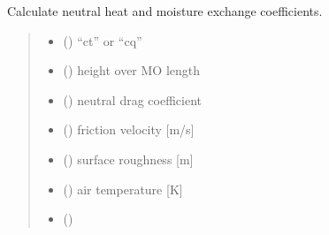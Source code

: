 \documentclass[letterpaper,10pt,english]{sphinxmanual}
\begin{document}
\begin{fulllineitems}

\pysigstartsignatures
{}
\pysigstopsignatures
\sphinxAtStartPar
Calculate neutral heat and moisture exchange coefficients.
\begin{quote}\begin{description}
\begin{itemize}
\item {} 
\sphinxAtStartPar
{} () \textendash{} “ct” or “cq”

\item {} 
\sphinxAtStartPar
{} () \textendash{} height over MO length

\item {} 
\sphinxAtStartPar
{} () \textendash{} neutral drag coefficient

\item {} 
\sphinxAtStartPar
{} () \textendash{} friction velocity      {[}m/s{]}

\item {} 
\sphinxAtStartPar
{} () \textendash{} surface roughness       {[}m{]}

\item {} 
\sphinxAtStartPar
{} () \textendash{} air temperature         {[}K{]}

\item {} 
\sphinxAtStartPar
{} () \textendash{} 

\end{itemize}


\end{description}
\end{quote}
\end{fulllineitems}
\end{document}
